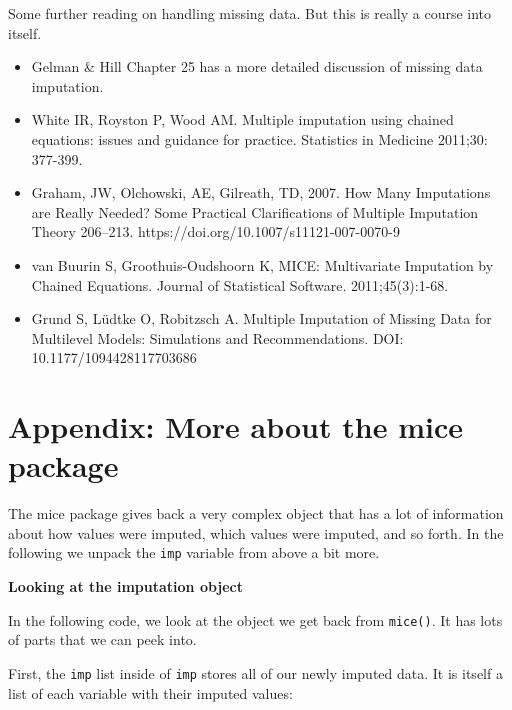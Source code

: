 \documentclass[
  letterpaper,
  DIV=11,
  numbers=noendperiod]{scrreprt}
\newenvironment{Shaded}{\begin{snugshade}}{\end{snugshade}}
\newcommand{\NormalTok}[1]{\textcolor[rgb]{0.00,0.44,0.13}{#1}}
\newcommand{\SpecialCharTok}[1]{\textcolor[rgb]{0.25,0.44,0.63}{#1}}
\begin{document}
Some further reading on handling missing data. But this is really a
course into itself.

\begin{itemize}
\item
  Gelman \& Hill Chapter 25 has a more detailed discussion of missing
  data imputation.
\item
  White IR, Royston P, Wood AM. Multiple imputation using chained
  equations: issues and guidance for practice. Statistics in Medicine
  2011;30: 377-399.
\item
  Graham, JW, Olchowski, AE, Gilreath, TD, 2007. How Many Imputations
  are Really Needed? Some Practical Clarifications of Multiple
  Imputation Theory 206--213. https://doi.org/10.1007/s11121-007-0070-9
\item
  van Buurin S, Groothuis-Oudshoorn K, MICE: Multivariate Imputation by
  Chained Equations. Journal of Statistical Software. 2011;45(3):1-68.
\item
  Grund S, Lüdtke O, Robitzsch A. Multiple Imputation of Missing Data
  for Multilevel Models: Simulations and Recommendations. DOI:
  10.1177/1094428117703686
\end{itemize}

\hypertarget{appendix-more-about-the-mice-package}{%
\section{Appendix: More about the mice
package}\label{appendix-more-about-the-mice-package}}

The mice package gives back a very complex object that has a lot of
information about how values were imputed, which values were imputed,
and so forth. In the following we unpack the \texttt{imp} variable from
above a bit more.

\textbf{Looking at the imputation object}

In the following code, we look at the object we get back from
\texttt{mice()}. It has lots of parts that we can peek into.

First, the \texttt{imp} list inside of \texttt{imp} stores all of our
newly imputed data. It is itself a list of each variable with their
imputed values:

\begin{Shaded}
\end{Shaded}
\end{document}
